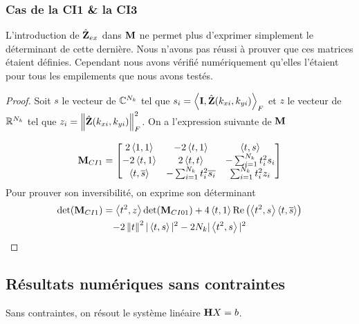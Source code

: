       \subsubsection{Cas de la CI1 \& la CI3}


      L'introduction de \(\hat{\mathbf{Z}}_{ex}\) dans \(\mathbf{M}\) ne permet plus d'exprimer simplement le déterminant de cette dernière. Nous n'avons pas réussi à prouver que ces matrices étaient définies. Cependant nous avons vérifié numériquement qu'elles l'étaient pour tous les empilements que nous avons testés.

      \begin{proof}
        Soit \(s\) le vecteur de \(\mathbb C^{N_{k}}\) tel que \(s_i = \left<{\mathbf{I}},{\hat{\mathbf{Z}}(k_{xi},k_{yi})}\right>_F\) et \(z\) le vecteur de \(\mathbb R^{N_{k}}\) tel que \(z_i = \left\lVert\hat{\mathbf{Z}}(k_{xi},k_{yi})\right\rVert_F^2\). On a l'expression suivante de \({\mathbf{M}}\)

        \begin{equation*}
          {\mathbf{M}}_{CI1} = \begin{bmatrix}
          2\left<{1},{1}\right>  & -2\left<{t},{1}\right> & \left<{t},{s}\right>
          \\
          -2\left<{t},{1}\right> & 2\left<{t},{t}\right> & -\sum_{i=1}^{N_{k}} t_i^2 s_i
          \\
          \left<{t},{{\overline{s}}}\right> & -\sum_{i=1}^{N_{k}} t_i^2 {\overline{s_i}} & \sum_{i=1}^{N_{k}} t_i^2 z_i
          \end{bmatrix}
        \end{equation*}
        Pour prouver son inversibilité, on exprime son déterminant 
        \begin{multline*}
          \det( {\mathbf{M}}_{CI1}) = \left<{t^2},{z}\right>\det({\mathbf{M}}_{CI01}) + 4 \left<{t},{1}\right>\operatorname{Re}\left(\left<{t^2},{s}\right>\left<{t},{{\overline{s}}}\right>\right)
          \\
          - 2\left\lVert t\right\rVert^2|\left<{t},{s}\right>|^2 - 2 N_k|\left<{t^2},{s}\right>|^2
        \end{multline*}
      \end{proof}

  \subsection{Résultats numériques sans contraintes}

      Sans contraintes, on résout le système linéaire \(\mathbf{H} X = b\). 

